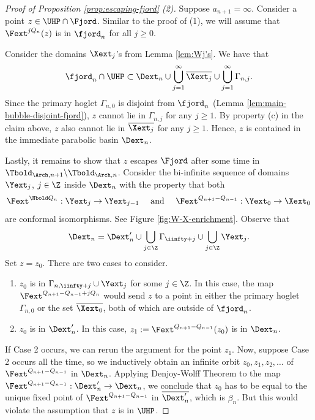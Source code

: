 \documentclass{amsart}
\begin{document}
\begin{proof}[Proof of Proposition \ref{prop:escaping-fjord} \textnormal{(2)}]
    Suppose $a_{n+1} = \infty$.
    Consider a point $z \in \UHP \cap \Fjord$.
    Similar to the proof of (1), we will assume that $\Fext^{jQ_n}(z)$ is in $\fjord_n$ for all $j \geq 0$.
    
    Consider the domains $\Xext_j$'s from Lemma \ref{lem:Wj's}.
    We have that
    \[
        \fjord_n \cap \UHP \subset \Dext_n \cup \bigcup_{j=1}^\infty \overline{\Xext_j} \cup \bigcup_{j=1}^\infty \Gamma_{n,j}.
    \]
    Since the primary hoglet $\Gamma_{n,0}$ is disjoint from $\fjord_n$ (Lemma \ref{lem:main-bubble-disjoint-fjord}), $z$ cannot lie in $\Gamma_{n,j}$ for any $j \geq 1$.
    By property (c) in the claim above, $z$ also cannot lie in $\overline{\Xext_j}$ for any $j \geq 1$.
    Hence, $z$ is contained in the immediate parabolic basin $\Dext_n$.

    Lastly, it remains to show that $z$ escapes $\Fjord$ after some time in $\Tbold_{\Arch,n+1} \backslash \Tbold_{\Arch,n}$.
    Consider the bi-infinite sequence of domains $\Yext_j$, $j \in \Z$ inside $\Dext_n$ with the property that both
    \[
        \Fext^{\Nbold  Q_n}: \Yext_j \to \Yext_{j-1} \quad \text{ and } \quad \Fext^{Q_{n+1}-Q_{n-1}}: \Yext_0 \to \Xext_0
    \]
    are conformal isomorphisms. See Figure \ref{fig:W-X-enrichment}.
    Observe that 
    \[
        \Dext_n = \Dext_n' \cup \bigcup_{j \in \Z} \Gamma_{\iinfty+j} \cup \bigcup_{j \in \Z} \Yext_j.
    \]
    Set $z = z_0$. 
    There are two cases to consider. 
    \begin{enumerate}[leftmargin=0.6in]
        \item[\underline{Case 1:}] $z_0$ is in $\Gamma_{n,\iinfty+j} \cup \Yext_j$ for some $j \in \Z$. 
        In this case, the map $\Fext^{Q_{n+1}-Q_{n-1}+jQ_n}$ would send $z$ to a point in either the primary hoglet $\Gamma_{n,0}$ or the set $\overline{\Xext_0}$, both of which are outside of $\fjord_n$. 
        \item[\underline{Case 2:}] $z_0$ is in $\Dext_n'$. In this case, $z_1 := \Fext^{Q_{n+1}-Q_{n-1}}(z_0)$ is in $\Dext_n$.
    \end{enumerate}
    If Case 2 occurs, we can rerun the argument for the point $z_1$.
    Now, suppose Case 2 occurs all the time, so we inductively obtain an infinite orbit $z_0, z_1,z_2,\ldots$ of $\Fext^{Q_{n+1}-Q_{n-1}}$ in $\Dext_n$. 
    Applying Denjoy-Wolff Theorem to the map $\Fext^{Q_{n+1}-Q_{n-1}}: \Dext'_n \to \Dext_n$, we conclude that $z_0$ has to be equal to the unique fixed point of $\Fext^{Q_{n+1}-Q_{n-1}}$ in $\overline{\Dext'_n}$, which is $\beta_n$.
    But this would violate the assumption that $z$ is in $\UHP$.
\end{proof}
\end{document}
